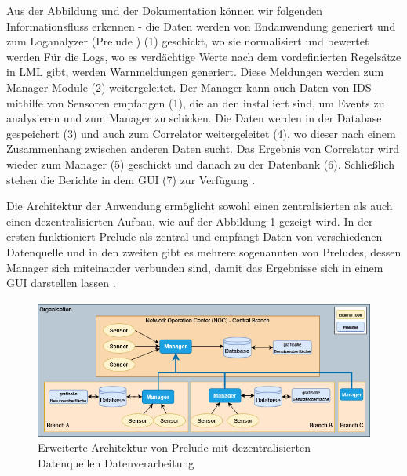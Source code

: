
Aus der Abbildung und der Dokumentation können wir folgenden Informationsfluss erkennen - die Daten werden von Endanwendung generiert und zum Loganalyzer (Prelude ) (1) geschickt, wo sie normalisiert und bewertet werden Für die Logs, wo es verdächtige Werte nach dem vordefinierten Regelsätze in \gls{LML} gibt, werden Warnmeldungen generiert. Diese Meldungen werden zum Manager Module (2) weitergeleitet. Der Manager kann auch Daten von \gls{IDS} mithilfe von Sensoren empfangen (1), die an den  installiert sind, um Events zu analysieren und zum Manager zu schicken. Die Daten werden in der Database gespeichert (3) und auch zum Correlator weitergeleitet (4), wo dieser nach einem Zusammenhang zwischen anderen Daten sucht. Das Ergebnis von Correlator wird wieder zum Manager (5) geschickt und danach zu der Datenbank (6). Schließlich stehen die Berichte in dem \gls{GUI} (7) zur Verfügung \citep{Prelude_Doc}.

Die Architektur der Anwendung ermöglicht sowohl einen zentralisierten als auch einen dezentralisierten Aufbau, wie auf der Abbildung \ref{fig:Prelude_erweitert} gezeigt wird. In der ersten funktioniert Prelude als zentral und empfängt Daten von verschiedenen Datenquelle und in den zweiten gibt es mehrere sogenannten  von Preludes, dessen Manager sich miteinander verbunden sind, damit das Ergebnisse sich in einem \gls{GUI} darstellen lassen \citep{Prelude_MU}.

\begin{figure}[H]
   \centering
   \includegraphics[width=1\textwidth]{assets/Branch_Prelude.drawio.png}
   \caption[Erweiterte Architektur von Prelude mit dezentralisierten Datenquellen und Datenverarbeitung]
   {Erweiterte Architektur von Prelude mit dezentralisierten Datenquellen Datenverarbeitung}
   \label{fig:Prelude_erweitert}
   \centering
\end{figure}

